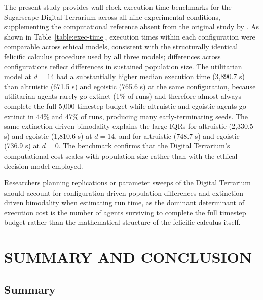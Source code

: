 \documentclass{icsthesis}
\begin{document}
\begin{mainmatter}
The present study provides wall-clock execution time benchmarks for the Sugarscape Digital Terrarium across all nine experimental conditions, supplementing the computational reference absent from the original study by \citet{KremerHerman2024}. As shown in Table~\ref{table:exec-time}, execution times within each configuration were comparable across ethical models, consistent with the structurally identical felicific calculus procedure used by all three models; differences across configurations reflect differences in sustained population size. The utilitarian model at $d = 14$ had a substantially higher median execution time (3,890.7 s) than altruistic (671.5 s) and egoistic (765.6 s) at the same configuration, because utilitarian agents rarely go extinct (1\% of runs) and therefore almost always complete the full 5,000-timestep budget while altruistic and egoistic agents go extinct in 44\% and 47\% of runs, producing many early-terminating seeds. The same extinction-driven bimodality explains the large IQRs for altruistic (2,330.5 s) and egoistic (1,810.6 s) at $d = 14$, and for altruistic (748.7 s) and egoistic (736.9 s) at $d = 0$. The benchmark confirms that the Digital Terrarium's computational cost scales with population size rather than with the ethical decision model employed.

Researchers planning replications or parameter sweeps of the Digital Terrarium should account for configuration-driven population differences and extinction-driven bimodality when estimating run time, as the dominant determinant of execution cost is the number of agents surviving to complete the full timestep budget rather than the mathematical structure of the felicific calculus itself.

		\section{SUMMARY AND CONCLUSION}

		\subsection{Summary}


\end{mainmatter}
\end{document}
